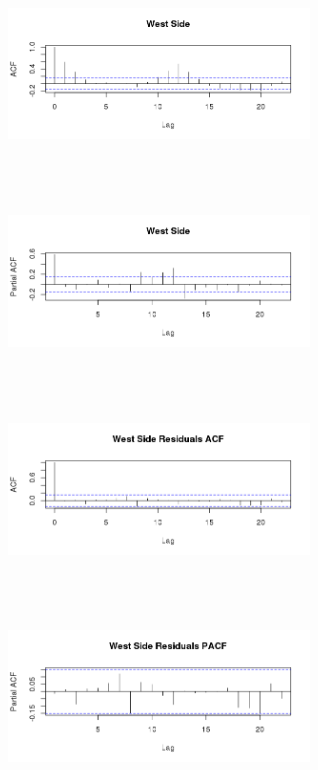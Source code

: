 \documentclass{article} %
\begin{document}
\begin{multicols}{2}
 \begin{figure}[H]
\includegraphics[height=50mm, width=80mm]{Plots/West_ACF.png}
\end{figure}
 
\begin{figure}[H]
\includegraphics[height=50mm, width=80mm]{Plots/West_PACF.png}
\end{figure}
 
\begin{figure}[H]
\includegraphics[height=50mm, width=80mm]{Plots/west_resids_ACF.png}
\end{figure}
 
\begin{figure}[H]
\includegraphics[height=50mm, width=80mm]{Plots/west_resids_PACF.png}
\end{figure}

 
 \end{multicols}
\end{document}
